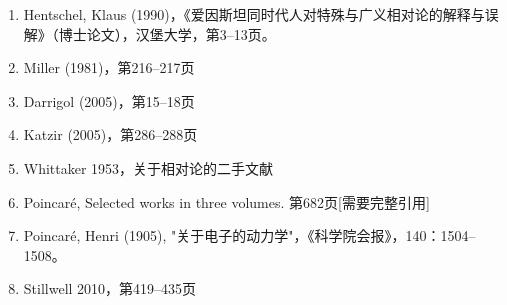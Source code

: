 \begin{enumerate}
\item Hentschel, Klaus (1990)，《爱因斯坦同时代人对特殊与广义相对论的解释与误解》（博士论文），汉堡大学，第3–13页。
\item Miller (1981)，第216–217页
\item Darrigol (2005)，第15–18页
\item Katzir (2005)，第286–288页
\item Whittaker 1953，关于相对论的二手文献
\item Poincaré, Selected works in three volumes. 第682页[需要完整引用]
\item Poincaré, Henri (1905), "关于电子的动力学"，《科学院会报》，140：1504–1508。
\item Stillwell 2010，第419–435页
\end{enumerate}